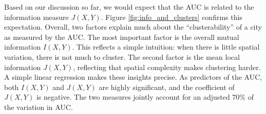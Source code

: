 	Based on our discussion so far, we would expect that the AUC is related to the information measure $J(X,Y)$. Figure \ref{fig:info_and_clusters} confirms this expectation. Overall, two factors explain much about the ``clusterability'' of a city as measured by the AUC. The most important factor is the overall mutual information $I(X,Y)$. This reflects a simple intuition: when there is little spatial variation, there is not much to cluster. The second factor is the mean local information $J(X,Y)$, reflecting that spatial complexity makes clustering harder. A simple linear regression makes these insights precise. As predictors of the AUC, both $I(X,Y)$ and $J(X,Y)$ are highly significant, and the coefficient of $J(X,Y)$ is negative. The two measures jointly account for an adjusted 70\% of the variation in AUC. 